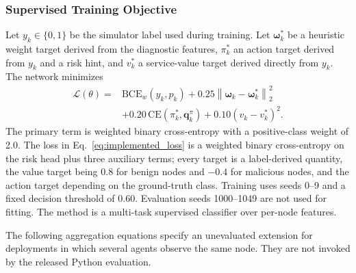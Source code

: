 \documentclass[notspecified,article,submit,moreauthors]{Definitions/mdpi}
\begin{document}
\subsubsection{Supervised Training Objective}
\label{sec:reward}
Let $y_k \in \{0,1\}$ be the simulator label used during training. Let $\boldsymbol{\omega}_k^{*}$ be a heuristic weight target derived from the diagnostic features, $\pi_k^{*}$ an action target derived from $y_k$ and a risk hint, and $v_k^{*}$ a service-value target derived directly from $y_k$. The network minimizes
\begin{equation}
\begin{aligned}
\mathcal{L}(\theta) ={}& \mathrm{BCE}_{w}(y_k,p_k)
 + 0.25 \left\|\boldsymbol{\omega}_k-\boldsymbol{\omega}_k^{*}\right\|_2^2\\
&+ 0.20\,\mathrm{CE}(\pi_k^{*},\mathbf{q}_k^{\pi})
 + 0.10 \left(v_k-v_k^{*}\right)^2 .
\end{aligned}
\label{eq:implemented_loss}
\end{equation}
The primary term is weighted binary cross-entropy with a positive-class weight of 2.0. The loss in Eq.~\ref{eq:implemented_loss} is a weighted binary cross-entropy on the risk head plus three auxiliary terms; every target is a label-derived quantity, the value target being $0.8$ for benign nodes and $-0.4$ for malicious nodes, and the action target depending on the ground-truth class. Training uses seeds 0--9 and a fixed decision threshold of 0.60. Evaluation seeds 1000--1049 are not used for fitting. The method is a multi-task supervised classifier over per-node features.

The following aggregation equations specify an unevaluated extension for deployments in which several agents observe the same node. They are not invoked by the released Python evaluation.
\end{document}
